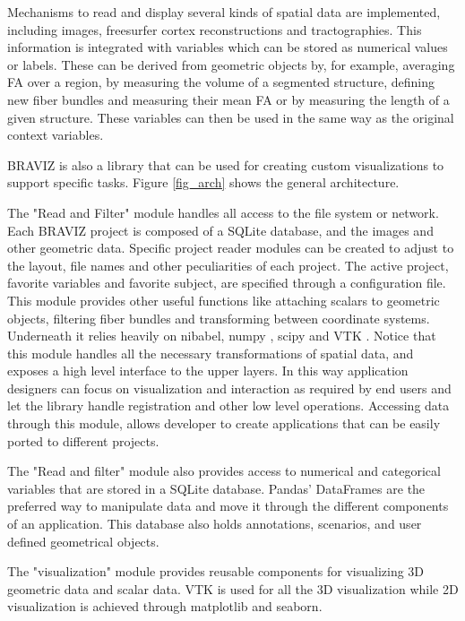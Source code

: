 \documentclass[utf8]{frontiersSCNS} %
\begin{document}
Mechanisms to read and display several kinds of spatial data are implemented, including images, freesurfer \citep{fischl_freesurfer_2012} cortex reconstructions and tractographies. This information is integrated with variables which can be stored as numerical values or labels. These can be derived from geometric objects by, for example, averaging FA over a region, by measuring the volume of a segmented structure, defining new fiber bundles and measuring their mean FA or by measuring the length of a given structure. These variables can then be used in the same way as the original context variables.

BRAVIZ is also a library that can be used for creating custom visualizations to support specific tasks. Figure \ref{fig_arch} shows the general architecture.

The "Read and Filter" module handles all access to the file system or network. Each BRAVIZ project is composed of a SQLite database, and the images and other geometric data. Specific project reader modules can be created to adjust to the layout, file names and other peculiarities of each project. The active project, favorite variables and favorite subject, are specified through a configuration file. This module provides other useful functions like attaching scalars to geometric objects, filtering fiber bundles and transforming between coordinate systems. Underneath it relies heavily on nibabel\citep{gorgolewski_nipype:_2011}, numpy\citep{van_der_walt_numpy_2011} , scipy\citep{jones_scipy:_2001,oliphant_python_2007} and VTK\citep{schroeder_vtk_1998} . Notice that this module handles all the necessary transformations of spatial data, and exposes a high level interface to the upper layers. In this way application designers can focus on visualization and interaction as required by end users and let the library handle registration and other low level operations. Accessing data through this module, allows developer to create applications that can be easily ported to different projects. 

The "Read and filter" module also provides access to numerical and categorical variables that are stored in a SQLite database. Pandas' DataFrames\citep{mckinney_data_2010} are the preferred way to manipulate data and move it through the different components of an application. This database also holds annotations, scenarios, and user defined geometrical objects. 

The "visualization" module provides reusable components for visualizing 3D geometric data and scalar data. VTK is used for all the 3D visualization while 2D visualization is achieved through matplotlib \citep{hunter_matplotlib:_2007} and seaborn\citep{michael_waskom_seaborn:_2014}.
\end{document}
